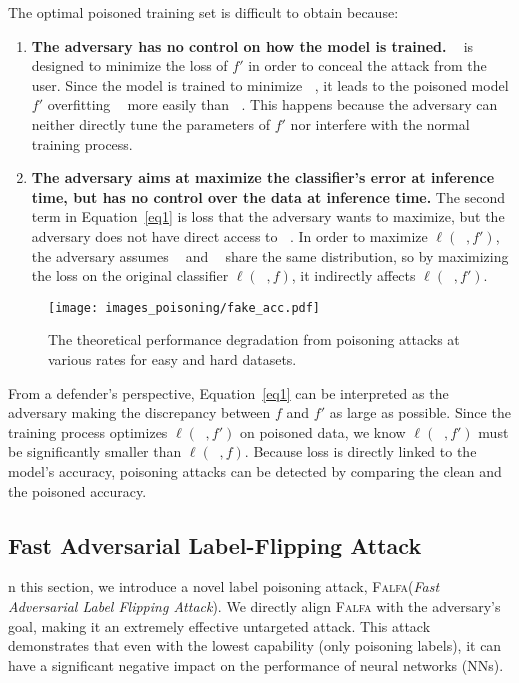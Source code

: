 \documentclass[runningheads]{llncs}
\newcommand{\falfa}{\textsc{Falfa}\xspace}
\DeclareMathOperator*{\Dpo}{\mathcal{D}^\prime_\text{train}}
\DeclareMathOperator*{\Dtr}{\mathcal{D}_\text{train}}
\DeclareMathOperator*{\Dte}{\mathcal{D}_\text{test}}
\begin{document}
The optimal poisoned training set is difficult to obtain because:
\begin{enumerate}
\item \textbf{The adversary has no control on how the model is trained.} 
$\Dpo$ is designed to minimize the loss of $f'$ in order to conceal the attack from the user.
Since the model is trained to minimize $\Dpo$, it leads to the poisoned model $f'$ overfitting $\Dpo$ more easily than $\Dtr$.
This happens because the adversary can neither directly tune the parameters of $f'$ nor interfere with the normal training process.

\item \textbf{The adversary aims at maximize the classifier's error at inference time, but has no control over the data at inference time.}
The second term in Equation~\ref{eq1} is loss that the adversary wants to maximize, but the adversary does not have direct access to $\Dte$.
In order to maximize $\ell(\Dte, f')$, the adversary assumes $\Dtr$ and $\Dte$ share the same distribution, so by maximizing the loss on the original classifier $\ell(\Dpo, f)$, it indirectly affects $\ell(\Dte, f')$.
\end{enumerate}

\begin{figure}[t!]
    \centering
    \texttt{[image: images\_poisoning/fake\_acc.pdf]}
    \caption[Theoretical Performance Degradation Under Poisoning Attacks.]{The theoretical performance degradation from poisoning attacks at various rates for easy and hard datasets.}
    \label{fig.fake}
\end{figure}

From a defender's perspective,
Equation~\ref{eq1} can be interpreted as the adversary making the discrepancy between $f$ and $f'$ as large as possible.
Since the training process optimizes $\ell(\Dpo, f')$ on poisoned data,
we know $\ell(\Dpo, f')$ must be significantly smaller than $\ell(\Dpo, f)$.
Because loss is directly linked to the model's accuracy, poisoning attacks can be detected by comparing the clean and the poisoned accuracy.

\subsection{Fast Adversarial Label-Flipping Attack}
\label{sec:method:falfa}

n this section, we introduce a novel label poisoning attack, \falfa (\emph{Fast Adversarial Label Flipping Attack}).
We directly align \falfa with the adversary's goal, making it an extremely effective untargeted attack.
This attack demonstrates that even with the lowest capability (only poisoning labels), it can have a significant negative impact on the performance of neural networks (NNs).
\end{document}
